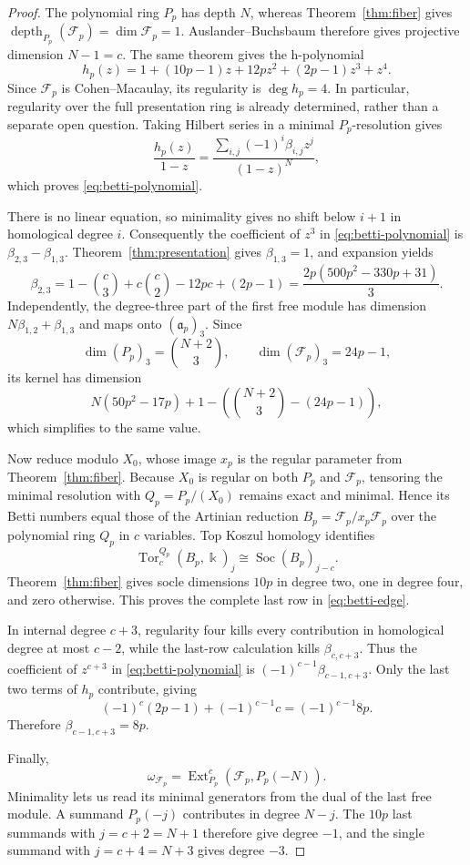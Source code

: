 \documentclass[11pt]{article}
\theoremstyle{definition}
\theoremstyle{remark}
\newcommand{\kfield}{\Bbbk}
\begin{document}
\begin{proof}
The polynomial ring $P_p$ has depth $N$, whereas Theorem~\ref{thm:fiber} gives
$\operatorname{depth}_{P_p}(\mathcal F_p)=\dim\mathcal F_p=1$. Auslander--Buchsbaum therefore
gives projective dimension $N-1=c$. The same theorem gives the h-polynomial
\[
h_p(z)=1+(10p-1)z+12pz^2+(2p-1)z^3+z^4.
\]
Since $\mathcal F_p$ is Cohen--Macaulay, its regularity is $\deg h_p=4$. In particular,
regularity over the full presentation ring is already determined, rather than a separate open
question. Taking Hilbert series in a minimal $P_p$-resolution gives
\[
\frac{h_p(z)}{1-z}
=\frac{\sum_{i,j}(-1)^i\beta_{i,j}z^j}{(1-z)^N},
\]
which proves \eqref{eq:betti-polynomial}.

There is no linear equation, so minimality gives no shift below $i+1$ in homological degree $i$.
Consequently the coefficient of $z^3$ in \eqref{eq:betti-polynomial} is
$\beta_{2,3}-\beta_{1,3}$. Theorem~\ref{thm:presentation} gives $\beta_{1,3}=1$, and expansion
yields
\[
\beta_{2,3}
=1-\binom{c}{3}+c\binom{c}{2}-12pc+(2p-1)
=\frac{2p(500p^2-330p+31)}{3}.
\]
Independently, the degree-three part of the first free module has dimension
$N\beta_{1,2}+\beta_{1,3}$ and maps onto $(\mathfrak a_p)_3$. Since
\[
\dim(P_p)_3=\binom{N+2}{3},\qquad
\dim(\mathcal F_p)_3=24p-1,
\]
its kernel has dimension
\[
N(50p^2-17p)+1-\left(\binom{N+2}{3}-(24p-1)\right),
\]
which simplifies to the same value.

Now reduce modulo $X_0$, whose image $x_p$ is the regular parameter from
Theorem~\ref{thm:fiber}. Because $X_0$ is regular on both $P_p$ and $\mathcal F_p$, tensoring the
minimal resolution with $Q_p=P_p/(X_0)$ remains exact and minimal. Hence its Betti numbers equal
those of the Artinian reduction $B_p=\mathcal F_p/x_p\mathcal F_p$ over the polynomial ring
$Q_p$ in $c$ variables. Top Koszul homology identifies
\[
\operatorname{Tor}^{Q_p}_c(B_p,\kfield)_j
\cong \operatorname{Soc}(B_p)_{j-c}.
\]
Theorem~\ref{thm:fiber} gives socle dimensions $10p$ in degree two, one in degree four, and zero
otherwise. This proves the complete last row in \eqref{eq:betti-edge}.

In internal degree $c+3$, regularity four kills every contribution in homological degree at most
$c-2$, while the last-row calculation kills $\beta_{c,c+3}$. Thus the coefficient of
$z^{c+3}$ in \eqref{eq:betti-polynomial} is
$(-1)^{c-1}\beta_{c-1,c+3}$. Only the last two terms of $h_p$ contribute, giving
\[
(-1)^c(2p-1)+(-1)^{c-1}c=(-1)^{c-1}8p.
\]
Therefore $\beta_{c-1,c+3}=8p$.

Finally,
\[
\omega_{\mathcal F_p}
=\operatorname{Ext}^{c}_{P_p}(\mathcal F_p,P_p(-N)).
\]
Minimality lets us read its minimal generators from the dual of the last free module. A summand
$P_p(-j)$ contributes in degree $N-j$. The $10p$ last summands with $j=c+2=N+1$ therefore give
degree $-1$, and the single summand with $j=c+4=N+3$ gives degree $-3$.
\end{proof}
\end{document}

